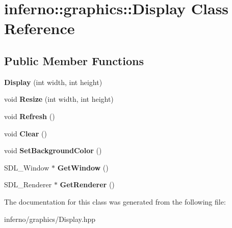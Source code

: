 \hypertarget{classinferno_1_1graphics_1_1_display}{}\section{inferno\+:\+:graphics\+:\+:Display Class Reference}
\label{classinferno_1_1graphics_1_1_display}
\subsection*{Public Member Functions}
\begin{DoxyCompactItemize}
\item 
\mbox{\label{classinferno_1_1graphics_1_1_display_a8209b018b72b97990c10e67054ef813e}} 
{\bfseries Display} (int width, int height)
\item 
\mbox{\label{classinferno_1_1graphics_1_1_display_abb7ee350b8273145d1b9a4e5c3c73b58}} 
void {\bfseries Resize} (int width, int height)
\item 
\mbox{\label{classinferno_1_1graphics_1_1_display_abb61ee638514984ecf3fb94e1fcdddec}} 
void {\bfseries Refresh} ()
\item 
\mbox{\label{classinferno_1_1graphics_1_1_display_aabd8a093188d59ac2399abd66e5f00d8}} 
void {\bfseries Clear} ()
\item 
\mbox{\label{classinferno_1_1graphics_1_1_display_a069358cb752031b94ff7a8439aa5ccd3}} 
void {\bfseries Set\+Background\+Color} ()
\item 
\mbox{\label{classinferno_1_1graphics_1_1_display_ae3eda38c23eae8e2d49bfab0ef3e2f6c}} 
S\+D\+L\+\_\+\+Window $\ast$ {\bfseries Get\+Window} ()
\item 
\mbox{\label{classinferno_1_1graphics_1_1_display_a6b2bd638d5f6b07b4a5cfad4a04fab41}} 
S\+D\+L\+\_\+\+Renderer $\ast$ {\bfseries Get\+Renderer} ()
\end{DoxyCompactItemize}


The documentation for this class was generated from the following file\+:\begin{DoxyCompactItemize}
\item 
inferno/graphics/Display.\+hpp\end{DoxyCompactItemize}
